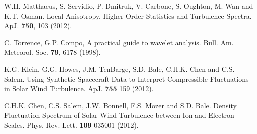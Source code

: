 \documentclass[aip,prl,amsmath,amssymb,reprint,superscriptaddress]{revtex4-1} %
\begin{document}
\begin{thebibliography}{99}
W.H. Matthaeus, S. Servidio, P. Dmitruk, V. Carbone, S. Oughton, M. Wan and K.T. Osman. Local Anisotropy, Higher Order Statistics and Turbulence Spectra. ApJ. {\bf 750}, 103 (2012).

C. Torrence, G.P. Compo, A practical guide to wavelet analysis. Bull. Am. Meteorol. Soc. {\bf 79}, 6178 (1998).

 K.G. Klein, G.G. Howes, J.M. TenBarge, S.D. Bale, C.H.K. Chen and C.S. Salem. Using Synthetic Spacecraft Data to Interpret Compressible Fluctuations in Solar Wind Turbulence. ApJ. {\bf 755} 159 (2012).

 C.H.K. Chen, C.S. Salem, J.W. Bonnell, F.S. Mozer and S.D. Bale. Density Fluctuation Spectrum of Solar Wind Turbulence between Ion and Electron Scales. Phys. Rev. Lett. {\bf 109} 035001 (2012).












\end{thebibliography}
\end{document}
